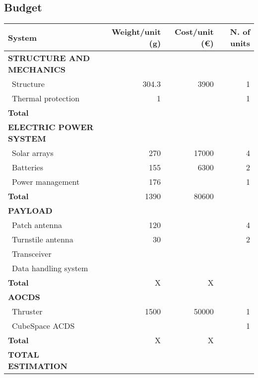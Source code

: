 
\subsection{Budget}

\begin{longtable}{| l | r | r | r |}
\rowcolor[gray]{0.80}	\textbf{System} & \textbf{Weight/unit (g)} & \textbf{Cost/unit (\euro)} & \textbf{N. of units}\\
    \hline
    \endfirsthead


\rowcolor[gray]{0.85} \textbf{STRUCTURE AND MECHANICS} & & & \\

   ~Structure & 304.3 & 3900 & 1 \\
   ~Thermal protection & 1 & & 1\\
   \hline
   \rowcolor[gray]{0.95} \textbf{Total} & & &  \\
   \hline
   
\rowcolor[gray]{0.85} \textbf{ELECTRIC POWER SYSTEM} & & & \\

   ~Solar arrays & 270 & 17000 & 4 \\
   ~Batteries & 155 & 6300 & 2 \\
   ~Power management & 176 & & 1 \\
   \hline
   \rowcolor[gray]{0.95} \textbf{Total} & 1390 & 80600 &  \\
   \hline

\rowcolor[gray]{0.85} \textbf{PAYLOAD} & & & \\

   ~Patch antenna & 120 & & 4 \\
   ~Turnstile antenna & 30 & & 2 \\
   ~Transceiver & & & \\
   ~Data handling system & & &\\
   \hline
   \rowcolor[gray]{0.95} \textbf{Total} & X & X & \\
   \hline
   
\rowcolor[gray]{0.85} \textbf{AOCDS} & & &\\

   ~Thruster & 1500 & 50000 & 1 \\
   ~CubeSpace ACDS & & & 1 \\
   \hline
   \rowcolor[gray]{0.95} \textbf{Total} & X & X & \\
   \hline
   
\rowcolor[gray]{0.9} \textbf{TOTAL ESTIMATION} & & & \\


\end{longtable} 
